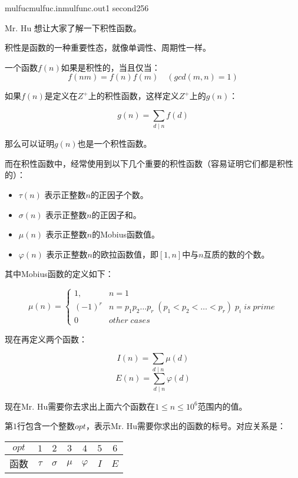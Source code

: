 \documentclass[11pt,a4paper,oneside]{article}
\begin{document}
\begin{problem}{mulfuc}{mulfuc.in}{mulfunc.out}{1 second}{256}
	
	Mr. Hu 想让大家了解一下积性函数。
	
	积性是函数的一种重要性态，就像单调性、周期性一样。
	
	一个函数$f(n)$如果是积性的，当且仅当：
	$$
		f(nm) = f(n)f(m) \quad (gcd(m,n) = 1)
	$$
	
	如果$f(n)$是定义在$Z^{+}$上的积性函数，这样定义$Z^{+}$上的$g(n)$：
	
	$$
	g(n) = \sum_{d \mid n} f(d)
	$$
	
	那么可以证明$g(n)$也是一个积性函数。
	
	而在积性函数中，经常使用到以下几个重要的积性函数（容易证明它们都是积性的）：
	
	\begin{itemize}
		\item $\tau(n)$  表示正整数$n$的正因子个数。
		\item $\sigma(n)$  表示正整数$n$的正因子和。
		\item $\mu(n)$  表示正整数$n$的Mobius函数值。
		\item $\varphi(n)$  表示正整数$n$的欧拉函数值，即$[1,n]$中与$n$互质的数的个数。
	\end{itemize}
	
	其中Mobius函数的定义如下： 
	
	$$
	\mu(n) = 
	\begin{cases}
	1,   & n = 1 \\
	(-1)^r  & n = p_1p_2\dots p_r \; (p_1 < p_2 < \dots < p_r) \; p_i \; is \; prime\\
	0  & other \; cases
	\end{cases}
	$$
	
	现在再定义两个函数：
	
	$$
	I(n) = \sum_{d \mid n} \mu(d)
	$$
	$$
	E(n) = \sum_{d \mid n} \varphi(d)
	$$
	
	现在Mr. Hu需要你去求出上面六个函数在$1 \leq n \leq 10^6$范围内的值。
	
	\InputFile 
	
	第$1$行包含一个整数$opt$，表示Mr. Hu需要你求出的函数的标号。对应关系是：
	
	\begin{table}[htbp]
		\centering
		\begin{tabular}{|c|c|c|c|c|c|c|}
			\hline
			$opt$ & $1$  & $2$ & $3$ & $4$ & $5$ & $6$ \\
			\hline
			函数 & $\tau$ & $\sigma$ & $\mu$ & $\varphi$ & $I$ & $E$ \\
			\hline
		\end{tabular}
	\end{table}
	

\end{problem}
\end{document}
